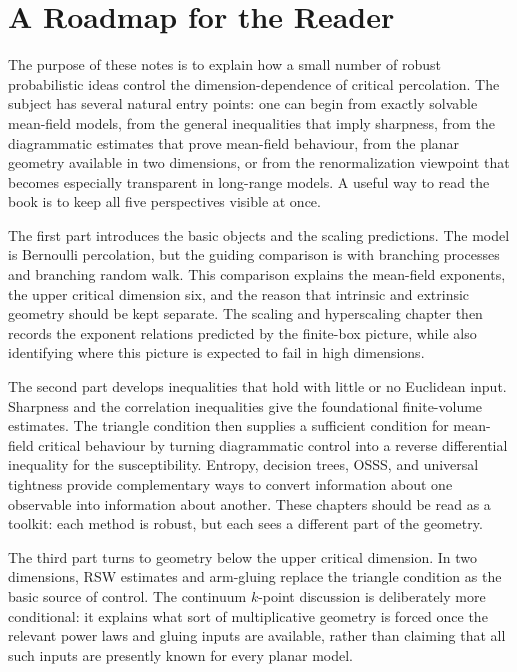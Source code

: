 \documentclass[11pt,reqno]{book}
\numberwithin{equation}{chapter}
\theoremstyle{plain}
\theoremstyle{definition}
\theoremstyle{remark}
\newcommand{\1}{\mathbf 1}
\begin{document}
\chapter*{A Roadmap for the Reader}

The purpose of these notes is to explain how a small number of robust probabilistic ideas control the dimension-dependence of critical percolation. The subject has several natural entry points: one can begin from exactly solvable mean-field models, from the general inequalities that imply sharpness, from the diagrammatic estimates that prove mean-field behaviour, from the planar geometry available in two dimensions, or from the renormalization viewpoint that becomes especially transparent in long-range models. A useful way to read the book is to keep all five perspectives visible at once.

The first part introduces the basic objects and the scaling predictions. The model is Bernoulli percolation, but the guiding comparison is with branching processes and branching random walk. This comparison explains the mean-field exponents, the upper critical dimension six, and the reason that intrinsic and extrinsic geometry should be kept separate. The scaling and hyperscaling chapter then records the exponent relations predicted by the finite-box picture, while also identifying where this picture is expected to fail in high dimensions.

The second part develops inequalities that hold with little or no Euclidean input. Sharpness and the correlation inequalities give the foundational finite-volume estimates. The triangle condition then supplies a sufficient condition for mean-field critical behaviour by turning diagrammatic control into a reverse differential inequality for the susceptibility. Entropy, decision trees, OSSS, and universal tightness provide complementary ways to convert information about one observable into information about another. These chapters should be read as a toolkit: each method is robust, but each sees a different part of the geometry.

The third part turns to geometry below the upper critical dimension. In two dimensions, RSW estimates and arm-gluing replace the triangle condition as the basic source of control. The continuum \(k\)-point discussion is deliberately more conditional: it explains what sort of multiplicative geometry is forced once the relevant power laws and gluing inputs are available, rather than claiming that all such inputs are presently known for every planar model.
\end{document}
